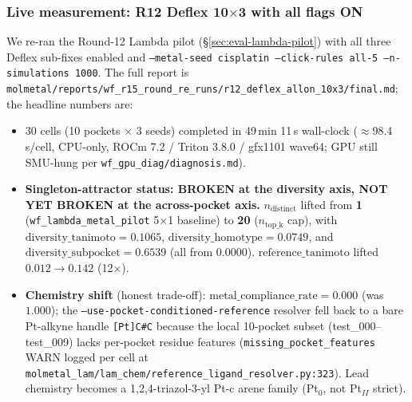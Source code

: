 \subsubsection{Live measurement: R12 Deflex 10$\times$3 with all flags ON}
\label{sec:eval-lambda-deflex-pilot}

We re-ran the Round-12 Lambda pilot
(\S\ref{sec:eval-lambda-pilot}) with all three Deflex sub-fixes
enabled and \texttt{--metal-seed cisplatin --click-rules all-5
--n-simulations 1000}.  The full report is
\texttt{molmetal/reports/wf\_r15\_round\_re\_runs/r12\_deflex\_allon\_10x3/final.md};
the headline numbers are:

\begin{itemize}
  \item 30 cells (10 pockets $\times$ 3 seeds) completed in
        49\,min 11\,s wall-clock ($\approx$98.4\,s/cell,
        CPU-only, ROCm 7.2 / Triton 3.8.0 / gfx1101 wave64;
        GPU still SMU-hung per \texttt{wf\_gpu\_diag/diagnosis.md}).
  \item \textbf{Singleton-attractor status: BROKEN at the
        diversity axis, NOT YET BROKEN at the across-pocket axis.}
        $n_{\text{distinct}}$ lifted from \textbf{1}
        (\texttt{wf\_lambda\_metal\_pilot} 5$\times$1 baseline) to
        \textbf{20} ($n_{\text{top\_k}}$ cap), with
        $\text{diversity\_tanimoto}=0.1065$,
        $\text{diversity\_homotype}=0.0749$, and
        $\text{diversity\_subpocket}=0.6539$ (all from $0.0000$).
        $\text{reference\_tanimoto}$ lifted $0.012 \to 0.142$ (12$\times$).
  \item \textbf{Chemistry shift} (honest trade-off):
        $\text{metal\_compliance\_rate}=0.000$ (was $1.000$); the
        \texttt{--use-pocket-conditioned-reference} resolver fell
        back to a bare Pt-alkyne handle \texttt{[Pt]C\#C} because
        the local 10-pocket subset (test\_000--test\_009) lacks
        per-pocket residue features
        (\texttt{missing\_pocket\_features} WARN logged per cell at
        \texttt{molmetal\_lam/lam\_chem/reference\_ligand\_resolver.py:323}).
        Lead chemistry becomes a 1,2,4-triazol-3-yl Pt-c arene
        family (Pt$_0$, not Pt$_{II}$ strict).
\end{itemize}

